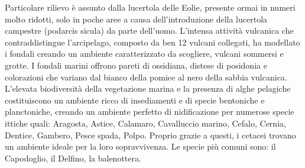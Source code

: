 \documentclass[fleqn,10pt]{SelfArx} %
\begin{document}
Particolare rilievo è assunto dalla lucertola delle Eolie, presente ormai in numeri molto ridotti, solo in poche aree a causa dell'introduzione della lucertola campestre (podarcis sicula) da parte dell'uomo.
L'intensa attività vulcanica che contraddistingue l'arcipelago, composto da ben 12 vulcani collegati, ha modellato i fondali creando un ambiente caratterizzato da scogliere, vulcani sommersi e grotte. 
I fondali marini offrono pareti di ossidiana, distese di posidonia e colorazioni che variano dal bianco della pomice al nero della sabbia vulcanica.
L'elevata biodiversità della vegetazione marina e la presenza di alghe pelagiche costituiscono un ambiente ricco di insediamenti e di specie bentoniche e planctoniche, creando un ambiente perfetto di nidificazione per numerose specie ittiche quali: Aragosta, Astice, Calamaro, Cavalluccio marino, Cefalo, Cernia, Dentice, Gambero, Pesce spada, Polpo. 
Proprio grazie a questi, i cetacei trovano un ambiente ideale per la loro sopravvivenza. 
Le specie più comuni sono: il Capodoglio, il Delfino, la balenottera.
\end{document}
